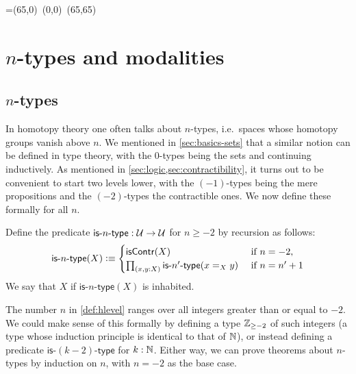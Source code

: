 \bgroup %

\newbox\pbbox
\setbox\pbbox=\hbox{\xy \POS(65,0)\ar@{-} (0,0) \ar@{-} (65,65)\endxy}
\def\pb{\save[]+<3.5mm,-3.5mm>*{\copy\pbbox} \restore}

\newcommand{\comp}[2]{\ensuremath{{#2} \circ {#1}}}
\newcommand{\istype}[1]{\mathsf{is}\mbox{-}{#1}\mbox{-}\mathsf{type}}
\newcommand{\nplusone}{\ensuremath{(n+1)}}
\newcommand{\nminusone}{\ensuremath{(n-1)}}
\newcommand{\fact}{\textsf{fact}}


\chapter{\texorpdfstring{$n$}{n}-types and modalities}
\label{cha:hlevels}

\section{$n$-types}

In homotopy theory one often talks about $n$-types, i.e.\ spaces whose homotopy groups vanish above $n$.
We mentioned in \autoref{sec:basics-sets} that a similar notion can be defined in type theory, with the $0$-types being the sets and continuing inductively.
As mentioned in \autoref{sec:logic,sec:contractibility}, it turns out to be convenient to start two levels lower, with the $(-1)$-types being the mere propositions and the $(-2)$-types the contractible ones.
We now define these formally for all $n$.

\begin{defn}\label{def:hlevel}
  Define the predicate $\istype{n} : \type \to \type$ for $n \geq -2$ by recursion as follows:
  \[ \istype{n}(X) \defeq
  \begin{cases}
    \iscontr(X) & \text{ if } n = -2 , \\
    \prd{x,y : X} \istype{n'}(\id[X]{x}{y}) & \text{ if } n = n'+1
  \end{cases}
  \]
  We say that $X$  if $\istype{n}(X)$ is inhabited.
\end{defn}

\begin{rmk}
  The number $n$ in \autoref{def:hlevel} ranges over all integers greater than or equal to $-2$.
  We could make sense of this formally by defining a type $\mathbb{Z}_{{\geq}-2}$ of such integers (a type whose induction principle is identical to that of $\mathbb{N}$), or instead defining a predicate $\istype{(k-2)}$ for $k : \mathbb{N}$.
  Either way, we can prove theorems about $n$-types by induction on $n$, with $n = -2$ as the base case.
\end{rmk}

